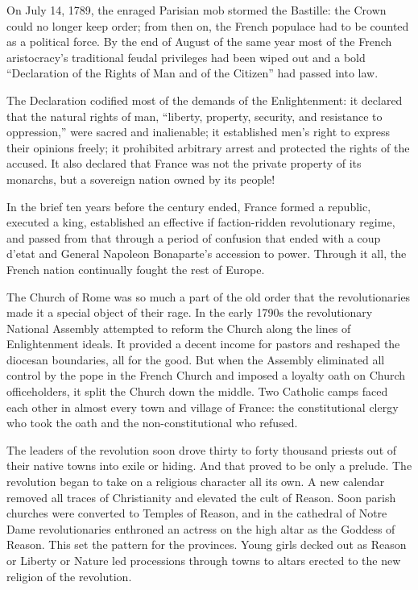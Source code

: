 On July 14, 1789, the enraged Parisian mob stormed the Bastille: the Crown could no longer keep
order; from then on, the French populace had to be counted as a political force. By the end of
August of the same year most of the French aristocracy’s traditional feudal privileges had been
wiped out and a bold “Declaration of the Rights of Man and of the Citizen” had passed into law.

The Declaration codified most of the demands of the Enlightenment: it declared that the natural
rights of man, “liberty, property, security, and resistance to oppression,” were sacred and
inalienable; it established men’s right to express their opinions freely; it prohibited arbitrary
arrest and protected the rights of the accused. It also declared that France was not the private
property of its monarchs, but a sovereign nation owned by its people!

In the brief ten years before the century ended, France formed a republic, executed a king,
established an effective if faction-ridden revolutionary regime, and passed from that through a
period of confusion that ended with a coup d’etat and General Napoleon Bonaparte’s accession to
power. Through it all, the French nation continually fought the rest of Europe.

The Church of Rome was so much a part of the old order that the revolutionaries made it a special
object of their rage. In the early 1790s the revolutionary National Assembly attempted to reform the
Church along the lines of Enlightenment ideals. It provided a decent income for pastors and reshaped
the diocesan boundaries, all for the good. But when the Assembly eliminated all control by the pope
in the French Church and imposed a loyalty oath on Church officeholders, it split the Church down
the middle. Two Catholic camps faced each other in almost every town and village of France: the
constitutional clergy who took the oath and the non-constitutional who refused.

The leaders of the revolution soon drove thirty to forty thousand priests out of their native towns
into exile or hiding. And that proved to be only a prelude. The revolution began to take on a
religious character all its own. A new calendar removed all traces of Christianity and elevated the
cult of Reason. Soon parish churches were converted to Temples of Reason, and in the cathedral of
Notre Dame revolutionaries enthroned an actress on the high altar as the Goddess of Reason. This set
the pattern for the provinces. Young girls decked out as Reason or Liberty or Nature led processions
through towns to altars erected to the new religion of the revolution.

